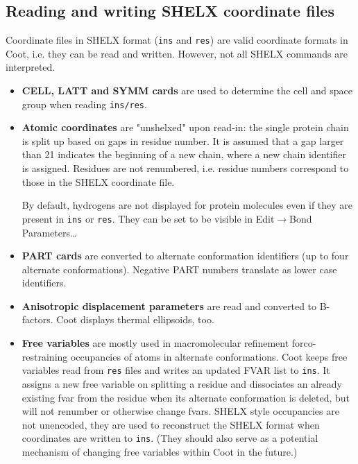 \documentclass{article}
\begin{document}
\subsection{Reading and writing SHELX coordinate files}
Coordinate files in SHELX format (\texttt{ins} and \texttt{res}) are valid coordinate formats in Coot, i.e. they can be read and written. However, not all SHELX commands are interpreted.

\begin{itemize}

\item {\bf CELL, LATT and SYMM cards} are used to determine the cell and space group when reading \texttt{ins/res}.

\item {\bf Atomic coordinates} are "unshelxed" upon read-in: the single protein chain is split up based on gaps in residue number. It is assumed that a gap larger than 21 indicates the beginning of a new chain, where a new chain identifier is assigned. Residues are not renumbered, i.e. residue numbers correspond to those in the SHELX coordinate file. %

By default, hydrogens are not displayed for protein molecules even if they are present in \texttt{ins} or \texttt{res}. They can be set to be visible in \textsf{Edit$\to$Bond Parameters\ldots}

\item {\bf PART cards} are converted to alternate conformation identifiers (up to four alternate conformations). Negative PART numbers translate as lower case identifiers.

\item {\bf Anisotropic displacement parameters} are read and converted to B-factors. Coot displays thermal ellipsoids, too.%

\item {\bf Free variables} are mostly used in macromolecular refinement for\linebreak[4]co-restraining occupancies of atoms in alternate conformations. Coot keeps free variables read from \texttt{res} files and writes an updated FVAR list to \texttt{ins}. It assigns a new free variable on splitting a residue and dissociates an already existing fvar from the residue when its alternate conformation is deleted, but will not renumber or otherwise change fvars. SHELX style occupancies are not unencoded, they are used to reconstruct the SHELX format when coordinates are written to \texttt{ins}. (They should also serve as a potential mechanism of changing free variables within Coot in the future.)


\end{itemize}
\end{document}
